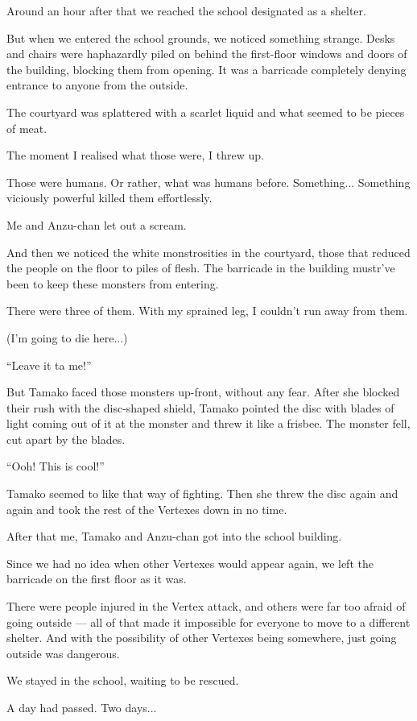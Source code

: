 Around an hour after that we reached the school designated as a shelter.

But when we entered the school grounds, we noticed something strange. Desks and chairs were haphazardly piled on behind the first-floor windows and doors of the building, blocking them from opening. It was a barricade completely denying entrance to anyone from the outside.

The courtyard was splattered with a scarlet liquid and what seemed to be pieces of meat.

The moment I realised what those were, I threw up.

Those were humans. Or rather, what was humans before. Something... Something viciously powerful killed them effortlessly.

Me and Anzu-chan let out a scream.

And then we noticed the white monstrosities in the courtyard, those that reduced the people on the floor to piles of flesh. The barricade in the building mustr've been to keep these monsters from entering.

There were three of them. With my sprained leg, I couldn't run away from them.

(I'm going to die here...)

``Leave it ta me!''

But Tamako faced those monsters up-front, without any fear. After she blocked their rush with the disc-shaped shield, Tamako pointed the disc with blades of light coming out of it at the monster and threw it like a frisbee. The monster fell, cut apart by the blades.

``Ooh! This is cool!''

Tamako seemed to like that way of fighting. Then she threw the disc again and again and took the rest of the Vertexes down in no time.

After that me, Tamako and Anzu-chan got into the school building.

Since we had no idea when other Vertexes would appear again, we left the barricade on the first floor as it was.

There were people injured in the Vertex attack, and others were far too afraid of going outside --- all of that made it impossible for everyone to move to a different shelter. And with the possibility of other Vertexes being somewhere, just going outside was dangerous.

We stayed in the school, waiting to be rescued.

A day had passed. Two days...

